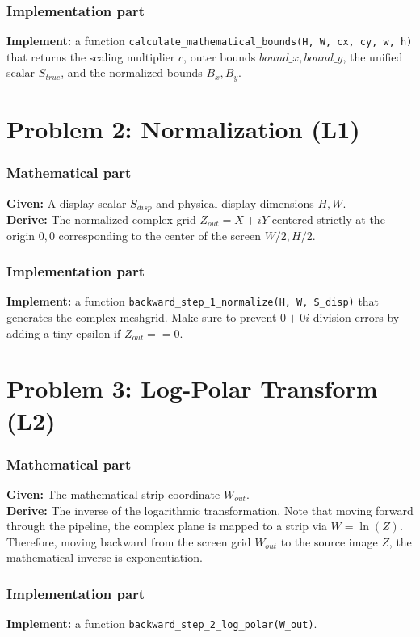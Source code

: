 \documentclass[11pt]{article}
\begin{document}
\subsubsection*{Implementation part}
\textbf{Implement:} a function \lstinline|calculate_mathematical_bounds(H, W, cx, cy, w, h)| that returns the scaling multiplier $c$, outer bounds $bound\_x, bound\_y$, the unified scalar $S_{true}$, and the normalized bounds $B_x, B_y$.

\section*{Problem 2: Normalization (L1)}

\subsubsection*{Mathematical part}
\textbf{Given:} A display scalar $S_{disp}$ and physical display dimensions $H, W$. \\
\textbf{Derive:} The normalized complex grid $Z_{out} = X + iY$ centered strictly at the origin $0,0$ corresponding to the center of the screen $W/2, H/2$. 

\subsubsection*{Implementation part}
\textbf{Implement:} a function \lstinline|backward_step_1_normalize(H, W, S_disp)| that generates the complex meshgrid. Make sure to prevent $0+0i$ division errors by adding a tiny epsilon if $Z_{out} == 0$.

\section*{Problem 3: Log-Polar Transform (L2)}

\subsubsection*{Mathematical part}
\textbf{Given:} The mathematical strip coordinate $W_{out}$. \\
\textbf{Derive:} The inverse of the logarithmic transformation. Note that moving forward through the pipeline, the complex plane is mapped to a strip via $W = \ln(Z)$. Therefore, moving backward from the screen grid $W_{out}$ to the source image $Z$, the mathematical inverse is exponentiation.

\subsubsection*{Implementation part}
\textbf{Implement:} a function \lstinline|backward_step_2_log_polar(W_out)|.
\end{document}
